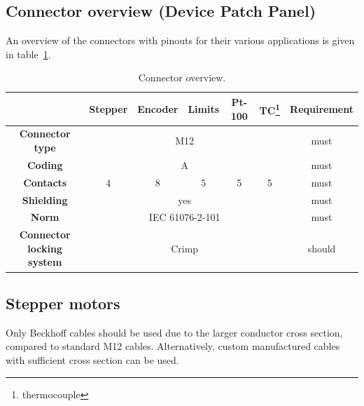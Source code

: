 \subsection{Connector overview (Device Patch Panel)}

An overview of the connectors with pinouts for their various applications is given in table~\ref{tab:connectorOverview}.

\begin{table}[!htb]
\caption{\label{tab:connectorOverview}Connector overview.}
\begin{minipage}{\linewidth}
\centering
\begin{tabular}{|c|c|c|c|c|c|c|}
\hline
\textbf{}                         & \textbf{Stepper} & \textbf{Encoder} & \textbf{Limits} & \textbf{Pt-100} & \textbf{TC}\footnote{thermocouple} & \textbf{Requirement} \\ \hline
\textbf{Connector type}           & \multicolumn{5}{c|}{M12}                                                              & must                 \\ \hline
\textbf{Coding}                   & \multicolumn{5}{c|}{A}                                                                & must                 \\ \hline
\textbf{Contacts}                 & 4                & 8                & 5               & 5               & 5           & must                 \\ \hline
\textbf{Shielding}                & \multicolumn{5}{c|}{yes}                                                              & must                 \\ \hline
\textbf{Norm}                     & \multicolumn{5}{c|}{IEC 61076-2-101}                                                   & must                 \\ \hline
\textbf{Connector locking system} & \multicolumn{5}{c|}{Crimp}                                                            & should               \\ \hline
\end{tabular}
\end{minipage}
\end{table}

\subsection{Stepper motors}
Only Beckhoff cables should be used due to the larger conductor cross section, compared to standard M12 cables.
Alternatively, custom manufactured cables with sufficient cross section can be used.

